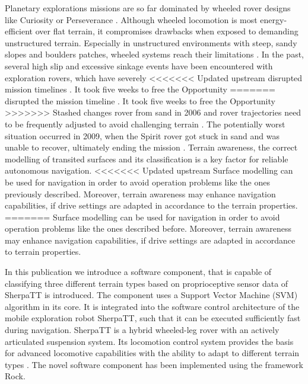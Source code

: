 \documentclass{article}
\begin{document}
Planetary explorations missions are so far dominated by wheeled rover designs like Curiosity
or Perseverance \cite{moeller2021, welch2013}. Although wheeled locomotion is most energy-efficient
over flat terrain, it compromises drawbacks when exposed to demanding unstructured
terrain. Especially in unstructured environments with steep, sandy slopes and boulders
patches, wheeled systems reach their limitations \cite{kolvenbach2021}. In the past, several high slip and
excessive sinkage events have been encountered with exploration rovers, which have severely
<<<<<<< Updated upstream
disrupted mission timelines \cite{gonzalez2018}. It took five weeks to free the Opportunity
=======
disrupted the mission timeline \cite{gonzalez2018}. It took five weeks to free the Opportunity
>>>>>>> Stashed changes
rover from sand in 2006 \cite{young2006} and rover trajectories need to be frequently adjusted to avoid
challenging terrain \cite{arvidson2017}. The potentially worst situation occurred in 2009, when the
Spirit rover got stuck in sand and was unable to recover, ultimately ending the mission
\cite{webster2009}. 
Terrain awareness, the correct modelling of transited surfaces and its classification is a key factor for reliable autonomous navigation. 
<<<<<<< Updated upstream
Surface modelling can be used for navigation in order to avoid operation problems like the ones previously described. 
Moreover, terrain awareness may enhance navigation capabilities, if drive settings are adapted in accordance to the 
terrain properties.
=======
Surface modelling can be used for navigation in order to avoid operation problems like the ones described before. 
Moreover, terrain awareness may enhance navigation capabilities, if drive settings are adapted in accordance to terrain properties.

In this publication we introduce a software component, that is capable of classifying three different terrain types based on proprioceptive sensor data of SherpaTT is introduced. 
The component uses a Support Vector Machine (SVM) algorithm \cite{vapnik1992,cristianini2000} in its core. It is integrated into the software control architecture of the mobile exploration robot SherpaTT, such that it can be executed sufficiently fast during navigation. SherpaTT is a hybrid wheeled-leg rover with an actively articulated suspension system. Its locomotion control system provides the basis for advanced locomotive capabilities with the ability to adapt to different terrain types \cite{cordes2018}. 
The novel software component has been implemented using the framework Rock.
\end{document}
